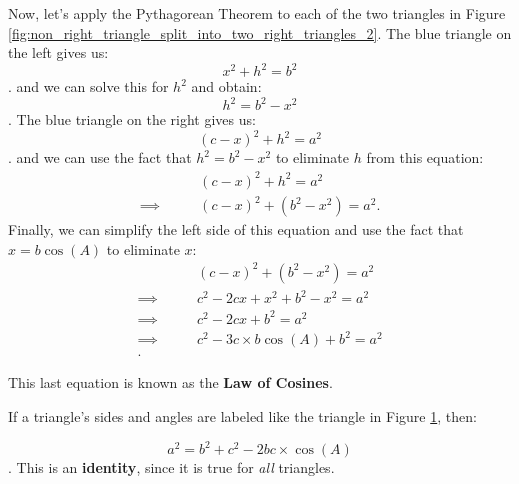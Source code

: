 Now, let's apply the Pythagorean Theorem to each of the two triangles in Figure
\ref{fig:non_right_triangle_split_into_two_right_triangles_2}. The blue triangle
on the left gives us:
\[ x^{2} + h^{2} = b^{2} \].
and we can solve this for $h^{2}$ and obtain:
\[ h^{2} = b^{2} - x^{2} \].
The blue triangle on the right gives us:
\[ (c - x)^{2} + h^{2} = a^{2} \].
and we can use the fact that $h^{2} = b^{2} - x^{2}$ to eliminate $h$ from this
equation:
\begin{align*}
  \qquad&(c - x)^{2} + h^{2} = a^{2} \\
  \implies\qquad&(c - x)^{2} + (b^{2} - x^{2}) = a^{2}
.\end{align*}
Finally, we can simplify the left side of this equation and use the fact that
$x = b\cos (A)$ to eliminate $x$:
\begin{align*}
  \qquad&(c - x)^{2} + (b^{2} - x^{2}) = a^{2} \\
  \implies\qquad&c^{2} - 2cx + x^{2} + b^{2} - x^{2} = a^{2} \\
  \implies\qquad&c^{2} - 2cx + b^{2} = a^{2} \\
  \implies\qquad&c^{2} - 3c \times b\cos (A) + b^{2} = a^{2} \\
.\end{align*}

This last equation is known as the \textbf{Law of Cosines}.

\begin{definition}
  \label{def:law_of_cosines}

  If a triangle's sides and angles are labeled like the triangle in Figure
  \ref{fig:law_of_cosines}, then:

	\begin{figure}[H]
		\centering


		\caption{}
		\label{fig:law_of_cosines}
	\end{figure}

  \[ a^{2} = b^{2} + c^{2} - 2bc \times \cos (A) \].
  This is an \textbf{identity}, since it is true for \textit{all} triangles.
\end{definition}


\newpage
